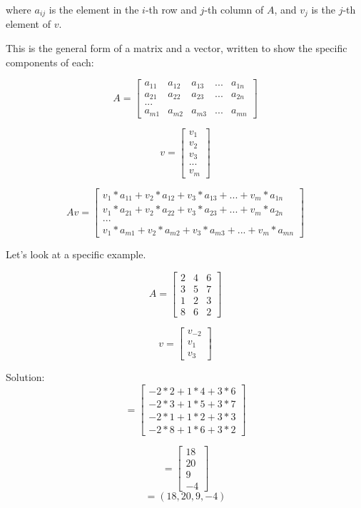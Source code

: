 where $a_{ij}$ is the element in the $i$-th row and $j$-th column of $A$, and $v_j$ is the $j$-th element of $v$.

This is the general form of a matrix and a vector, written to show the specific components of each:


 $$A = \begin{bmatrix}
 a_{11} &a_{12}  &a_{13} &... &a_{1n}  \\
 a_{21} &a_{22}  &a_{23} &... &a_{2n}  \\
 ... \\
 a_{m1} &a_{m2}  &a_{m3} &... &a_{mn}  
\end{bmatrix}$$

$$v = \begin{bmatrix}
 v_{1}  \\
 v_{2} \\
 v_{3} \\
 ... \\
 v_{m} 
\end{bmatrix}$$

 $$Av =\begin{bmatrix}
 v_{1}*a_{11} +v_{2}*a_{12}  +v_{3}*a_{13} +... +v_{m}*a_{1n}  \\
 v_{1}*a_{21} +v_{2}*a_{22}  +v_{3}*a_{23} +... +v_{m}*a_{2n}  \\
 ... \\
 v_{1}*a_{m1} +v_{2}*a_{m2}  +v_{3}*a_{m3} +... +v_{m}*a_{mn}  
\end{bmatrix}$$

Let's look at a specific example.

$$A = \begin{bmatrix}
 2  &4 &6  \\
 3  &5 &7  \\
 1  &2 &3  \\
 8  &6 &2 
\end{bmatrix}$$

$$v = \begin{bmatrix}
 v_{-2}  \\
 v_{1} \\
 v_{3} 
\end{bmatrix}$$

Solution:
$$= \begin{bmatrix}
-2*2+1*4+3*6\\
-2*3+1*5+3*7\\
 -2*1+1*2+3*3\\
-2*8+1*6+3*2
\end{bmatrix}$$

$$= \begin{bmatrix}
18 \\
20\\
9\\
-4 
\end{bmatrix}$$
$$= (18,20,9,-4)$$

